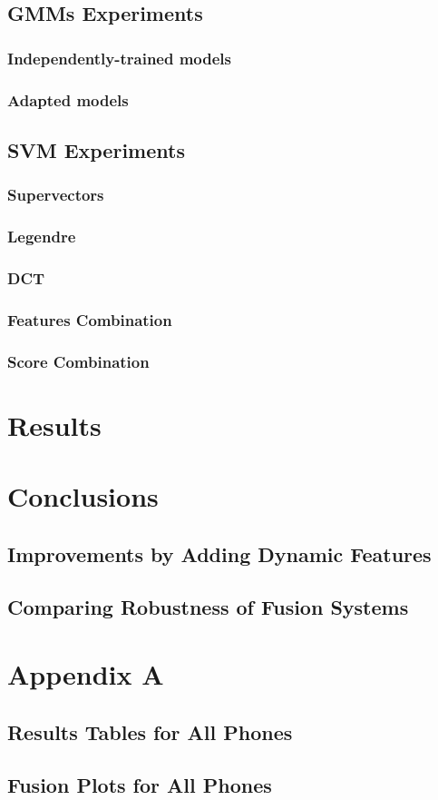 \documentclass[11pt,a4paper]{tesis}
\begin{document}
	\section{GMMs Experiments}
		\subsection{Independently-trained models}
		\subsection{Adapted models}
	\section{SVM Experiments}
		\subsection{Supervectors}
		\subsection{Legendre}
			
		\subsection{DCT}
		\subsection{Features Combination}
		\subsection{Score Combination}

\chapter{Results}
	

\chapter{Conclusions}
	\section{Improvements by Adding Dynamic Features}
	\section{Comparing Robustness of Fusion Systems}

\chapter{Appendix A}
	\section{Results Tables for All Phones}
		
	\section{Fusion Plots for All Phones}
		

\printbibliography
 
\end{document}
